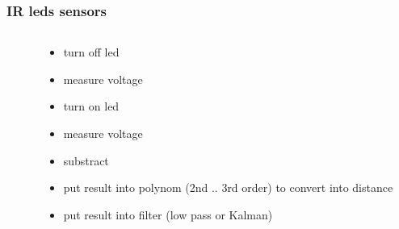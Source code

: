 \documentclass{beamer}
\begin{document}
\begin{frame}

  \frametitle{\bf IR leds sensors}
  
  \begin{columns}

    \begin{column}{0.5\textwidth}
    \end{column}

    \begin{column}{0.5\textwidth}
      \begin{itemize}
        \item turn off led
        \item measure voltage
        \item turn on led
        \item measure voltage
        \item substract
        \item put result into polynom (2nd .. 3rd order) to convert into distance
        \item put result into filter (low pass or Kalman)
      \end{itemize}
    \end{column}

  \end{columns}


\end{frame}
\end{document}
